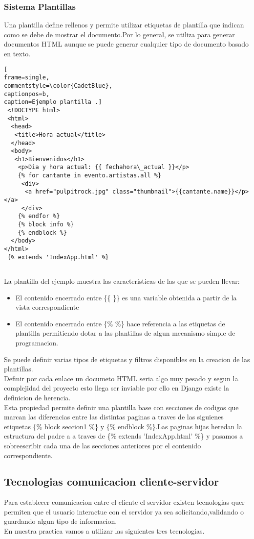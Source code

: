 \subsubsection{Sistema Plantillas}
Una plantilla define rellenos y permite utilizar etiquetas de plantilla que indican como se debe de mostrar el documento.Por lo general, se utiliza para generar documentos HTML aunque se puede generar cualquier tipo de documento basado en texto.
\begin{lstlisting}[
frame=single,
commentstyle=\color{CadetBlue},
captionpos=b,
caption=Ejemplo plantilla .]
 <!DOCTYPE html>
 <html>
  <head>
   <title>Hora actual</title>
  </head>
  <body>
   <h1>Bienvenidos</h1>
    <p>Dia y hora actual: {{ fechahora\_actual }}</p>
    {% for cantante in evento.artistas.all %}
     <div>
      <a href="pulpitrock.jpg" class="thumbnail">{{cantante.name}}</p></a>
     </div>
    {% endfor %}
    {% block info %}
    {% endblock %}
  </body>    
</html>
 {% extends 'IndexApp.html' %}
	
\end{lstlisting}
La plantilla del ejemplo muestra las caracteristicas de las que se pueden llevar:
\begin{itemize}
\item El contenido encerrado entre \{\{ \}\} es una variable obtenida a partir de la vista correspondiente
\item El contenido encerrado entre \{\% \%\} hace referencia a las etiquetas de plantilla permitiendo dotar a las plantillas de algun mecanismo simple de programacion.
\end{itemize}
Se puede definir varias tipos de etiquetas y filtros disponibles en la creacion de las plantillas.
\\Definir por cada enlace un documeto HTML seria algo muy pesado y segun la complejidad del proyecto esto llega ser inviable por ello en Django existe la definicion de herencia.
\\Esta propiedad permite definir una plantilla base con secciones de codigos que marcan las diferencias entre las distintas paginas a traves de las siguienes etiquetas \{\% block seccion1 \%\} y  \{\% endblock \%\}.Las paginas hijas heredan la estructura del padre a a traves de  \{\% extends 'IndexApp.html' \%\} y pasamos a sobreescribir cada una de las secciones anteriores por el contenido correspondiente.
\subsection{Tecnologias comunicacion cliente-servidor}
Para establecer comunicacion entre el cliente-el servidor existen tecnologias quer permiten que el usuario interactue con el servidor ya sea solicitando,validando o guardando algun tipo de informacion. \\En nuestra practica vamos a utilizar las siguientes tres tecnologias.

